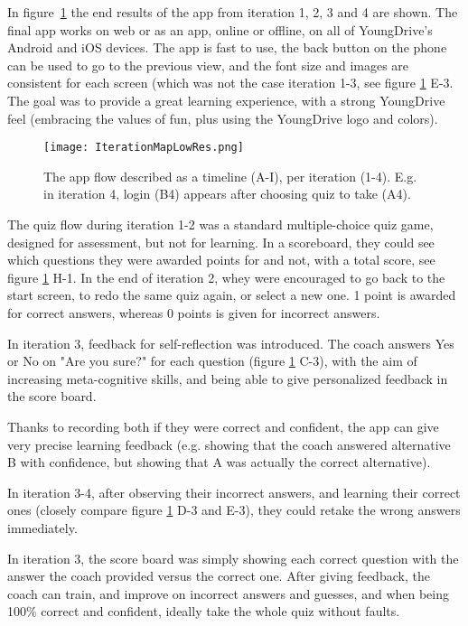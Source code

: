In figure~\ref{fig:iteration-map} the end results of the app from iteration 1, 2, 3 and 4 are shown. The final app works on web or as an app, online or offline, on all of YoungDrive's Android and iOS devices. The app is fast to use, the back button on the phone can be used to go to the previous view, and the font size and images are consistent for each screen (which was not the case iteration 1-3, see figure \ref{fig:iteration-map} E-3. The goal was to provide a great learning experience, with a strong YoungDrive feel (embracing the values of fun, plus using the YoungDrive logo and colors).

  \begin{figure}[h]
    \centering
    \texttt{[image: IterationMapLowRes.png]}
    \caption{The app flow described as a timeline (A-I), per iteration (1-4). E.g. in iteration 4, login (B4) appears after choosing quiz to take (A4).}
    \label{fig:iteration-map}
  \end{figure}


  The quiz flow during iteration 1-2 was a standard multiple-choice quiz game, designed for assessment, but not for learning. In a scoreboard, they could see which questions they were awarded points for and not, with a total score, see figure \ref{fig:iteration-map} H-1. In the end of iteration 2, whey were encouraged to go back to the start screen, to redo the same quiz again, or select a new one. 1 point is awarded for correct answers, whereas 0 points is given for incorrect answers.

  In iteration 3, feedback for self-reflection was introduced. The coach answers Yes or No on "Are you sure?" for each question (figure \ref{fig:iteration-map} C-3), with the aim of increasing meta-cognitive skills, and being able to give personalized feedback in the score board.

  Thanks to recording both if they were correct and confident, the app can give very precise learning feedback (e.g. showing that the coach answered alternative B with confidence, but showing that A was actually the correct alternative).

  In iteration 3-4, after observing their incorrect answers, and learning their correct ones (closely compare figure \ref{fig:iteration-map} D-3 and E-3), they could retake the wrong answers immediately.

  In iteration 3, the score board was simply showing each correct question with the answer the coach provided versus the correct one. After giving feedback, the coach can train, and improve on incorrect answers and guesses, and when being 100\% correct and confident, ideally take the whole quiz without faults.

